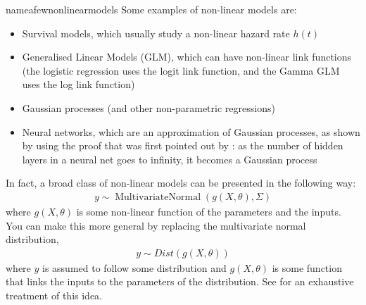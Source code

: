 \begin{answer}{nameafewnonlinearmodels}
Some examples of non-linear models are:
\begin{itemize}
  \item Survival models, which usually study a non-linear hazard rate $h(t)$
  \item Generalised Linear Models (GLM), which can have non-linear link functions
  (the logistic regression uses the logit link function, and the Gamma GLM uses the log link function)
  \item Gaussian processes (and other non-parametric regressions)
  \item Neural networks, which are an approximation of Gaussian processes, as shown by \citet[chap.~15.4]{murphy2012machine} using the proof that was first pointed out by  \citet{neal1996bayesian}: as the number of hidden layers in a neural net goes to infinity, it becomes a Gaussian process
\end{itemize}
In fact, a broad class of non-linear models can be presented in the following way:
\begin{align*}
  y \sim
  \operatorname{MultivariateNormal}( g(X,\theta), \Sigma )
\end{align*}
where $g(X,\theta)$ is some non-linear function of the parameters and the inputs.
You can make this more general by replacing the multivariate normal distribution,
\begin{align*}
  y \sim Dist( g(X,\theta) )
\end{align*}
where $y$ is assumed to follow some distribution and $g(X, \theta)$ is some function that links the inputs to the parameters of the distribution.
See \citet{murphy2012machine} for an exhaustive treatment of this idea.

\end{answer}
